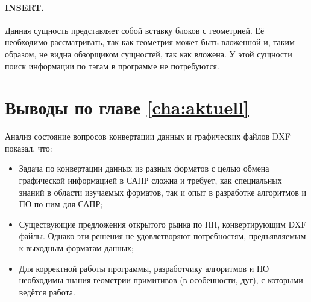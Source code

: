 \paragraph{INSERT.} Данная сущность представляет собой вставку блоков с геометрией. Её необходимо рассматривать, так как геометрия может быть вложенной и, таким образом, не видна обзорщиком сущностей, так как вложена. У этой сущности поиск информации по тэгам в программе не потребуются.


\section{Выводы по главе \ref{cha:aktuell}}
Анализ состояние вопросов конвертации данных и графических файлов DXF показал, что:
\begin{itemize}
	\item Задача по конвертации данных из разных форматов с целью обмена графической информацией в САПР сложна и требует, как специальных знаний в области изучаемых форматов, так и опыт в разработке алгоритмов и ПО по ним для САПР;
	\item Существующие предложения открытого рынка по ПП, конвертирующим DXF файлы. Однако эти решения не удовлетворяют потребностям, предъявляемым к выходным форматам данных;
	\item Для корректной работы программы, разработчику алгоритмов и ПО необходимы знания геометрии примитивов (в особенности, дуг), с которыми ведётся работа.	
\end{itemize}
